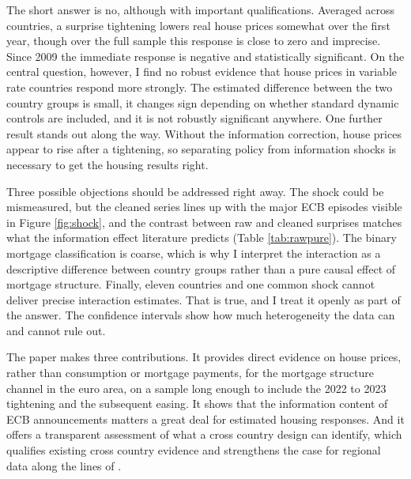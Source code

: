The short answer is no, although with important qualifications. Averaged
across countries, a
surprise tightening lowers real house prices somewhat over the first year,
though over the full sample this response is close to zero and imprecise.
Since 2009 the immediate response is negative and statistically
significant. On the central question, however, I find no robust evidence
that house prices in variable rate countries respond more strongly. The
estimated difference between the two country groups is small, it changes
sign depending on whether standard dynamic controls are included, and it
is not robustly significant anywhere. One further result stands out along
the way. Without the information correction, house prices appear to rise
after a tightening, so separating policy from information shocks is
necessary to get the housing results right.

Three possible objections should be addressed right away. The shock could be
mismeasured, but the cleaned series lines up with the major ECB episodes
visible in Figure \ref{fig:shock}, and the contrast between raw and cleaned
surprises matches what the information effect literature predicts
(Table \ref{tab:rawpure}). The binary mortgage
classification is coarse, which is why I interpret the interaction as a
descriptive difference between country groups rather than a pure causal
effect of mortgage structure. Finally, eleven countries and one common
shock cannot deliver precise interaction estimates. That is true, and I
treat it openly as part of the answer. The confidence intervals show how
much heterogeneity the data can and cannot rule out.

The paper makes three contributions. It provides direct evidence on house
prices, rather than consumption or mortgage payments, for the mortgage
structure channel in the euro area, on a sample long enough to include the
2022 to 2023 tightening and the subsequent easing. It shows that the
information content of ECB announcements matters a great deal for
estimated housing responses. And it offers a transparent assessment of what a cross
country design can identify, which qualifies existing cross country
evidence and strengthens the case for regional data along the lines of
\citet{battistini2025}.
